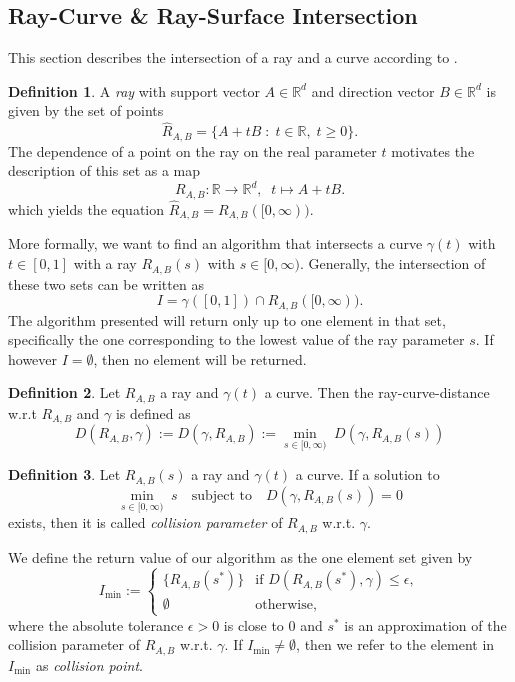 \documentclass[a4paper, 11pt]{report}
\theoremstyle{definition}
\newtheorem{definition}{Definition}[section]
\renewcommand{\emph}[1]{\textit{#1}}
\begin{document}
\subsection{Ray-Curve \& Ray-Surface Intersection}\label{subsec:raymarching}
	This section describes the intersection of a ray and a curve according to \cite{Hart1996}.

	\begin{definition}
		A \emph{ray} with support vector $A \in \mathbb{R}^d$ and direction vector $B \in \mathbb{R}^d$ is given by the set of points
			\begin{equation*}
				\hat R_{A,B} = \{A + tB \;:\; t \in \mathbb{R},\; t \geq 0\}.
			\end{equation*}
		The dependence of a point on the ray on the real parameter $t$ motivates the description of this set as a map
			$$R_{A,B}: \mathbb{R} \rightarrow \mathbb{R}^d,\;\; t \mapsto A+tB.$$
		which yields the equation $\hat R_{A,B} = R_{A,B}([0,\infty))$.
	\end{definition}

	More formally, we want to find an algorithm that intersects a curve $\gamma(t)$ with $t \in [0, 1]$ with a ray $R_{A,B}(s)$ with $s \in [0, \infty)$. Generally, the intersection of these two sets can be written as
		$$I = \gamma([0,1]) \cap R_{A,B}([0,\infty)).$$
	The algorithm presented will return only up to one element in that set, specifically the one corresponding to the lowest value of the ray parameter $s$. If however $I = \emptyset$, then no element will be returned.

	\begin{definition}
		Let $R_{A,B}$ a ray and $\gamma(t)$ a curve. Then the ray-curve-distance w.r.t $R_{A,B}$ and $\gamma$ is defined as
			$$ D(R_{A,B}, \gamma) := D(\gamma, R_{A,B}) := \underset{s\in[0,\infty)}{\min} \; D(\gamma, R_{A,B}(s))$$
	\end{definition}
	
	\begin{definition}\label{def:raycollisionparameter}
		Let $R_{A,B}(s)$ a ray and $\gamma(t)$ a curve. If a solution to 
			$$\underset{s\in[0,\infty)}{\min} \; s \quad \text{subject to} \quad D(\gamma, R_{A,B}(s)) = 0$$
		exists, then it is called \emph{collision parameter} of $R_{A,B}$ w.r.t. $\gamma$.
	\end{definition}

	We define the return value of our algorithm as the one element set given by
		$$ I_{\min} := 
			\begin{cases}
				\{R_{A,B}(s^*)\} 	&\text{if } D(R_{A,B}(s^*), \gamma) \leq \epsilon, \\
				\emptyset			&\text{otherwise,}	
			\end{cases}
		$$
	where the absolute tolerance $\epsilon > 0$ is close to $0$ and $s^*$ is an approximation of the collision parameter of $R_{A,B}$ w.r.t. $\gamma$. If $I_{\min} \neq \emptyset$, then we refer to the element in $I_{\min}$ as \emph{collision point}.
\end{document}
